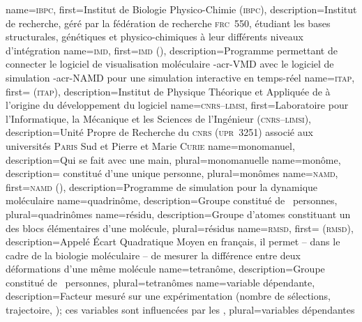 %
{%
	name={\textsc{ibpc}},%
	first={Institut de Biologie Physico-Chimie (\textsc{ibpc})},%
	description={Institut de recherche, géré par la fédération de recherche \textsc{frc}~550, étudiant les bases structurales, génétiques et physico-chimiques à leur différents niveaux d'intégration}%
}
%
{%
	name={\textsc{imd}},%
	first={\textsc{imd} ()},%
	description={Programme permettant de connecter le logiciel de visualisation moléculaire \myacro-{acr-VMD} avec le logiciel de simulation \myacro-{acr-NAMD} pour une simulation interactive en temps-réel }%
}
%
{%
	name={\textsc{itap}},%
	first={ (\textsc{itap})},%
	description={Institut de Physique Théorique et Appliquée de  à l'origine du développement du logiciel }%
}
%
{%
	name={\textsc{cnrs--limsi}},%
	first={Laboratoire pour l'Informatique, la Mécanique et les Sciences de l'Ingénieur (\textsc{cnrs--limsi})},%
	description={Unité Propre de Recherche du \textsc{cnrs} (\textsc{upr}~3251) associé aux universités \textsc{Paris} Sud et Pierre et Marie \textsc{Curie}}%
}
%
{%
	name={monomanuel},%
	description={Qui se fait avec une main},%
	plural={monomanuelle}%
}
%
{%
	name={monôme},%
	description={ constitué d'une unique personne},%
	plural={monômes}%
}
%
{%
	name={\textsc{namd}},%
	first={\textsc{namd} ()},%
	description={Programme de simulation pour la dynamique moléculaire }%
}
%
{%
	name={quadrinôme},%
	description={Groupe constitué de ~personnes},%
	plural={quadrinômes}%
}
%
{%
	name={résidu},%
	description={Groupe d'atomes constituant un des blocs élémentaires d'une molécule},%
	plural={résidus}%
}
%
{%
	name={\textsc{rmsd}},%
	first={ (\textsc{rmsd})},%
	description={Appelé Écart Quadratique Moyen en français, il permet -- dans le cadre de la biologie moléculaire -- de mesurer la différence entre deux déformations d'une même molécule}%
}
%
{%
	name={tetranôme},%
	description={Groupe constitué de ~personnes},%
	plural={tetranômes}%
}
%
{%
	name={variable dépendante},%
	description={Facteur mesuré sur une expérimentation (nombre de sélections, trajectoire, \myetc); ces variables sont influencées par les },%
	plural={variables dépendantes}%
}
